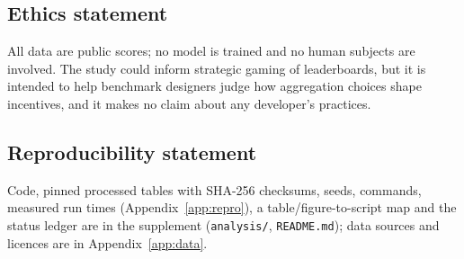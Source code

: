 \subsection*{Ethics statement}
All data are public scores; no model is trained and no human subjects are involved. The study could inform strategic gaming of leaderboards, but it is intended to help benchmark designers judge how aggregation choices shape incentives, and it makes no claim about any developer's practices.
\subsection*{Reproducibility statement}
Code, pinned processed tables with SHA-256 checksums, seeds, commands, measured run times (Appendix~\ref{app:repro}), a table/figure-to-script map and the status ledger are in the supplement (\texttt{analysis/}, \texttt{README.md}); data sources and licences are in Appendix~\ref{app:data}.
